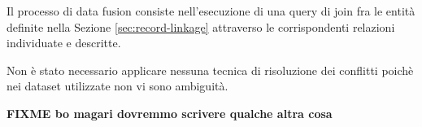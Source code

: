 Il processo di data fusion consiste nell'esecuzione di una query di join 
fra le entità definite nella Sezione \ref{sec:record-linkage} attraverso le 
corrispondenti relazioni individuate e descritte.

Non è stato necessario applicare nessuna tecnica di risoluzione dei conflitti 
poichè nei dataset utilizzate non vi sono ambiguità.

\textbf{FIXME bo magari dovremmo scrivere qualche altra cosa}
